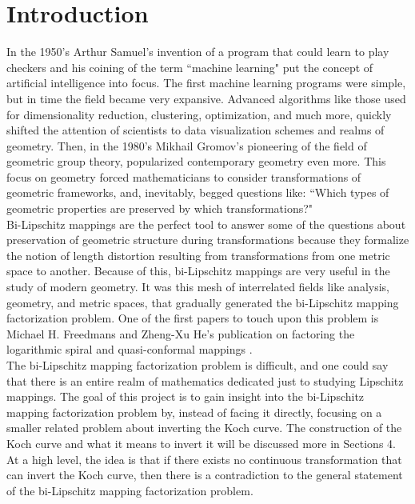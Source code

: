 \documentclass{article}
\theoremstyle{definition}
\begin{document}
\section{Introduction}
In the 1950's Arthur Samuel's invention of a program that could learn to play checkers and his coining of the term ``machine learning" put the concept of artificial intelligence into focus. The first machine learning programs were simple, but in time the field became very expansive. Advanced algorithms like those used for dimensionality reduction, clustering, optimization, and much more, quickly shifted the attention of scientists to data visualization schemes and realms of geometry. Then, in the 1980's Mikhail Gromov's pioneering of the field of geometric group theory, popularized contemporary geometry even more. This focus on geometry forced mathematicians to consider transformations of geometric frameworks, and, inevitably, begged questions like: ``Which types of geometric properties are preserved by which transformations?" \cite{bah2013energyawareadaptivebilipschitzembeddings}\vspace{0.5em}\\
Bi-Lipschitz mappings are the perfect tool to answer some of the questions about preservation of geometric structure during transformations because they formalize the notion of length distortion resulting from transformations from one metric space to another. Because of this, bi-Lipschitz mappings are very useful in the study of modern geometry. It was this mesh of interrelated fields like analysis, geometry, and metric spaces, that gradually generated the bi-Lipschitz mapping factorization problem. One of the first papers to touch upon this problem is Michael H. Freedmans and Zheng-Xu He's publication on factoring the logarithmic spiral and quasi-conformal mappings \cite{Freedman1988}.\vspace{0.5em}\\
The bi-Lipschitz mapping factorization problem is difficult, and one could say that there is an entire realm of mathematics dedicated just to studying Lipschitz mappings. The goal of this project is to gain insight into the bi-Lipschitz mapping factorization problem by, instead of facing it directly, focusing on a smaller related problem about inverting the Koch curve. The construction of the Koch curve and what it means to invert it will be discussed more in Sections 4. At a high level, the idea is that if there exists no continuous transformation that can invert the Koch curve, then there is a contradiction to the general statement of the bi-Lipschitz mapping factorization problem.\vspace{0.5em}\\
\end{document}
